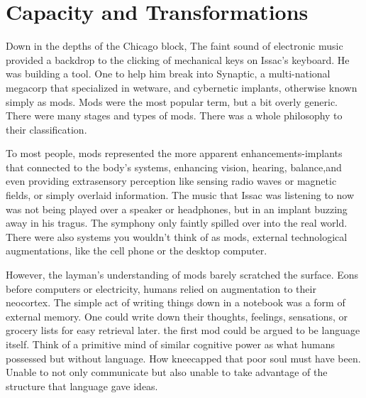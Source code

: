 \chapter{Capacity and Transformations}


Down in the depths of the Chicago block, The faint sound of electronic music provided a backdrop to the clicking of mechanical keys on Issac's keyboard. He was building a tool. One to help him break into Synaptic, a multi\hyp{}national megacorp that specialized in wetware, and cybernetic implants, otherwise known simply as mods. Mods were the most popular term, but a bit overly generic. There were many stages and types of mods. There was a whole philosophy to their classification.

To most people, mods represented the more apparent enhancements\hyp{}implants that connected to the body's systems, enhancing vision, hearing, balance,and even providing extrasensory perception like sensing radio waves or magnetic fields, or simply overlaid information. The music that Issac was listening to now was not being played over a speaker or headphones, but in an implant buzzing away in his tragus. The symphony only faintly spilled over into the real world. There were also systems you wouldn't think of as mods, external technological augmentations, like the cell phone or the desktop computer.

However, the layman's understanding of mods barely scratched the surface. Eons before computers or electricity, humans relied on augmentation to their neocortex. The simple act of writing things down in a notebook was a form of external memory. One could write down their thoughts, feelings, sensations, or grocery lists for easy retrieval later. the first mod could be argued to be language itself. Think of a primitive mind of similar cognitive power as what humans possessed but without language. How kneecapped that poor soul must have been. Unable to not only communicate but also unable to take advantage of the structure that language gave ideas.
    

